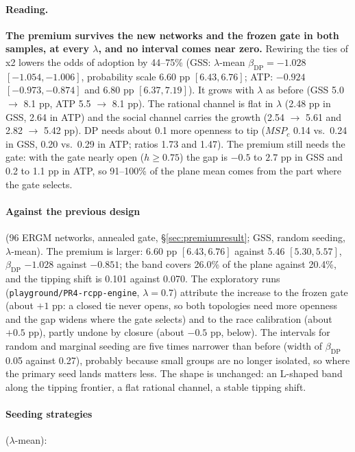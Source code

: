 \documentclass[11pt,a4paper]{article}
\newcommand{\code}[1]{\texttt{#1}}
\begin{document}
\paragraph{Reading.} \textbf{The premium survives the new networks and the frozen gate in both
samples, at every $\lambda$, and no interval comes near zero.} Rewiring the ties of x2 lowers
the odds of adoption by 44--75\% (GSS: $\lambda$-mean $\beta_{\text{DP}} = -1.028$
$[-1.054, -1.006]$, probability scale 6.60 pp $[6.43, 6.76]$; ATP: $-0.924$
$[-0.973, -0.874]$ and 6.80 pp $[6.37, 7.19]$). It grows with $\lambda$ as before (GSS
5.0 $\to$ 8.1 pp, ATP 5.5 $\to$ 8.1 pp). The rational channel is flat in $\lambda$ (2.48 pp in
GSS, 2.64 in ATP) and the social channel carries the growth (2.54 $\to$ 5.61 and
2.82 $\to$ 5.42 pp). DP needs about 0.1 more openness to tip ($MSP_c$ 0.14 vs.\ 0.24 in GSS,
0.20 vs.\ 0.29 in ATP; ratios 1.73 and 1.47). The premium still needs the gate: with the gate
nearly open ($h \ge 0.75$) the gap is $-0.5$ to $2.7$ pp in GSS and 0.2 to 1.1 pp in ATP, so 91--100\%
of the plane mean comes from the part where the gate selects.

\paragraph{Against the previous design} (96 ERGM networks, annealed gate,
\S\ref{sec:premiumresult}; GSS, random seeding, $\lambda$-mean). The premium is larger:
6.60 pp $[6.43, 6.76]$ against 5.46 $[5.30, 5.57]$, $\beta_{\text{DP}}$ $-1.028$ against
$-0.851$; the band covers 26.0\% of the plane against 20.4\%, and the tipping shift is
0.101 against 0.070. The exploratory runs (\code{playground/PR4-rcpp-engine},
$\lambda = 0.7$) attribute the increase to the frozen gate (about $+1$ pp: a closed tie never
opens, so both topologies need more openness and the gap widens where the gate selects)
and to the race calibration (about $+0.5$ pp), partly undone by closure (about $-0.5$ pp,
below). The intervals for random and marginal seeding are five times narrower than before
(width of $\beta_{\text{DP}}$ 0.05 against 0.27), probably because small groups are no
longer isolated, so where the primary seed lands matters less. The shape is unchanged: an
L-shaped band along the tipping frontier, a flat rational channel, a stable tipping shift.

\paragraph{Seeding strategies} ($\lambda$-mean):
\end{document}
